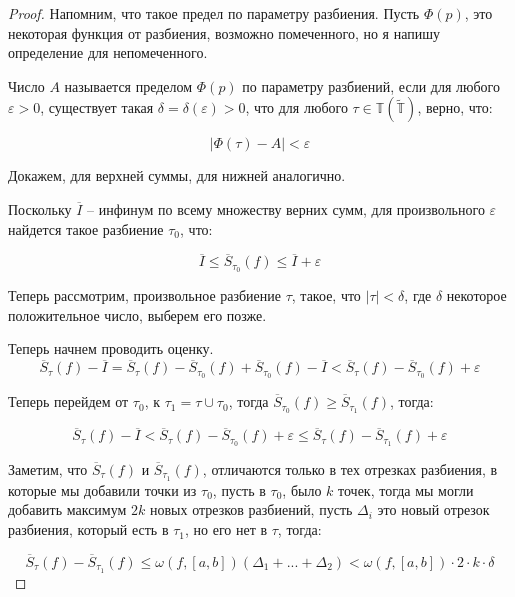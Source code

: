 \documentclass{article}
\theoremstyle{plain}
\theoremstyle{definition}
\theoremstyle{remark}
\renewcommand{\*}{\cdot}
\begin{document}
\begin{proof}
    Напомним, что такое предел по параметру разбиения. Пусть $\Phi(p)$, это некоторая функция от разбиения, возможно помеченного, 
    но я напишу определение для непомеченного. 
    
    Число $A$ называется пределом $\Phi(p)$ по параметру разбиений, если  для 
    любого $\varepsilon > 0$, существует такая $\delta = \delta(\varepsilon) > 0$, 
    что для любого $\tau \in \mathbb{T} (\mathbb{ \widetilde{T}})$, верно, что:

    \[
        \left| \Phi(\tau) - A \right| < \varepsilon
    \]

    Докажем, для верхней суммы, для нижней аналогично.

    Поскольку $\overline{I}$ -- инфинум по всему множеству верних сумм, для произвольного $\varepsilon$ найдется такое разбиение $\tau_0$, что:

    \[
    \overline{I} \leq \overline{S}_{\tau_0}(f) \leq \overline{I} + \varepsilon
    \]

    Теперь рассмотрим, произвольное разбиение $\tau$, такое, что $|\tau| < \delta$, где $\delta$ некоторое положительное число, выберем его позже.

    Теперь начнем проводить оценку.
    \[
        \overline{S}_{\tau}(f) - \overline{I} = \overline{S}_{\tau}(f) - \overline{S}_{\tau_0}(f) + \overline{S}_{\tau_0}(f) - \overline{I} < 
        \overline{S}_{\tau}(f) - \overline{S}_{\tau_0}(f) + \varepsilon
    \]

    Теперь перейдем от $\tau_0$, к $\tau_1 = \tau \cup \tau_0$, тогда $\overline{S}_{\tau_0}(f) \geq \overline{S}_{\tau_1}(f)$, тогда:

    \[
        \overline{S}_{\tau}(f) - \overline{I}  < 
        \overline{S}_{\tau}(f) - \overline{S}_{\tau_0}(f) + \varepsilon \leq 
        \overline{S}_{\tau}(f) - \overline{S}_{\tau_1}(f) + \varepsilon
    \]

    Заметим, что $\overline{S}_{\tau}(f) $ и $\overline{S}_{\tau_1}(f)$, отличаются только 
    в тех отрезках разбиения, в которые мы добавили точки из $\tau_0$, пусть в $\tau_0$, было $k$ точек, 
    тогда мы могли добавить максимум $2k$ новых отрезков разбиений, пусть $\Delta_i$ это новый отрезок разбиения, 
    который есть в $\tau_1$, но его нет в $\tau$, тогда:
    
    \[ 
        \overline{S}_{\tau}(f)  - \overline{S}_{\tau_1}(f) \leq \omega(f, [a,b]) (\Delta_1 + ... + \Delta_2) < \omega(f, [a,b]) \* 2 \* k \* \delta
    \]


\end{proof}
\end{document}
